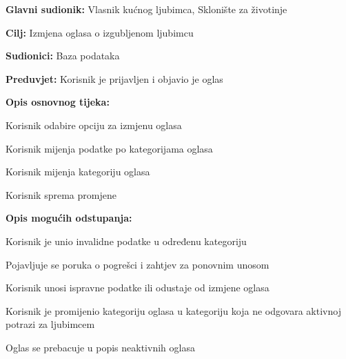 \noindent {}
\begin{packed_item}

	\item \textbf{Glavni sudionik: }Vlasnik kućnog ljubimca, Sklonište za životinje
	\item  \textbf{Cilj:} Izmjena oglasa o izgubljenom ljubimcu
	\item  \textbf{Sudionici:} Baza podataka
	\item  \textbf{Preduvjet:} Korisnik je prijavljen i objavio je oglas
	\item  \textbf{Opis osnovnog tijeka:}

	\item[] \begin{packed_enum}

		\item Korisnik odabire opciju za izmjenu oglasa
		\item
		\begin{packed_item}
			\item[a$)$] Korisnik mijenja podatke po kategorijama oglasa
			\item[b$)$] Korisnik mijenja kategoriju oglasa
		\end{packed_item}
		\item Korisnik sprema promjene
	\end{packed_enum}

	\item  \textbf{Opis mogućih odstupanja:}

	\item[] \begin{packed_item}

		\item[2.a] Korisnik je unio invalidne podatke u određenu kategoriju
		\item[] \begin{packed_enum}

			\item  Pojavljuje se poruka o pogrešci i zahtjev za ponovnim unosom
			\item Korisnik unosi ispravne podatke ili odustaje od izmjene oglasa

		\end{packed_enum}
		\item[2.b] Korisnik je promijenio kategoriju oglasa u kategoriju koja ne odgovara aktivnoj potrazi za ljubimcem
		\begin{packed_enum}

			\item Oglas se prebacuje u popis neaktivnih oglasa

		\end{packed_enum}

	\end{packed_item}
\end{packed_item}
